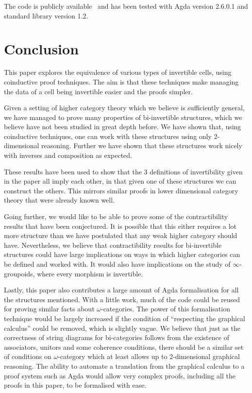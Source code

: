 \documentclass{article}
\theoremstyle{definition}
\theoremstyle{remark}
\begin{document}
The code is publicly available~\cite{rice_agda} and has been tested with Agda version 2.6.0.1 and standard library version 1.2.

\section{Conclusion}\label{sec:conclusion}

This paper explores the equivalence of various types of invertible cells, using coinductive proof techniques. The aim is that these techniques make managing the data of a cell being invertible easier and the proofs simpler.

Given a setting of higher category theory which we believe is sufficiently general, we have managed to prove many properties of bi-invertible structures, which we believe have not been studied in great depth before. We have shown that, using coinductive techniques, one can work with these structures using only 2-dimensional reasoning. Further we have shown that these structures work nicely with inverses and composition as expected.

These results have been used to show that the 3 definitions of invertibility given in the paper all imply each other, in that given one of these structures we can construct the others. This mirrors similar proofs in lower dimensional category theory that were already known well.

Going further, we would like to be able to prove some of the contractibility results that have been conjectured. It is possible that this either requires a lot more structure than we have postulated that any weak higher category should have. Nevertheless, we believe that contractibility results for bi-invertible structures could have large implications on ways in which higher categories can be defined and worked with. It would also have implications on the study of \(\infty\)-groupoids, where every morphism is invertible.

Lastly, this paper also contributes a large amount of Agda formalisation for all the structures mentioned. With a little work, much of the code could be reused for proving similar facts about \(\omega\)-categories. The power of this formalisation technique would be largely increased if the condition of ``respecting the graphical calculus'' could be removed, which is slightly vague. We believe that just as the correctness of string diagrams for bi-categories follows from the existence of associators, unitors and some coherence conditions, there should be a similar set of conditions on \(\omega\)-category which at least allows up to 2-dimensional graphical reasoning. The ability to automate a translation from the graphical calculus to a proof system such as Agda would allow very complex proofs, including all the proofs in this paper, to be formalised with ease.

\printbibliography{}
\end{document}
